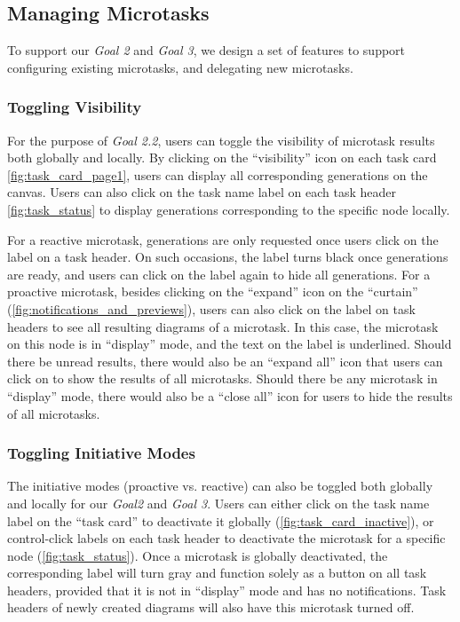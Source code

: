 % 

\subsection{Managing Microtasks}
To support our \textit{Goal 2} and \textit{Goal 3}, we design a set of features to support configuring existing microtasks, and delegating new microtasks.


\subsubsection{Toggling Visibility}
For the purpose of \textit{Goal 2.2}, users can toggle the visibility of microtask results both globally and locally. By clicking on the ``visibility'' icon on each task card \autoref{fig:task_card_page1}, users can display all corresponding generations on the canvas. Users can also click on the task name label on each task header \autoref{fig:task_status} to display generations corresponding to the specific node locally.

For a reactive microtask, generations are only requested once users click on the label on a task header. On such occasions, the label turns black once generations are ready, and users can click on the label again to hide all generations. For a proactive microtask, besides clicking on the ``expand'' icon on the ``curtain'' (\autoref{fig:notifications_and_previews}), users can also click on the label on task headers to see all resulting diagrams of a microtask. In this case, the microtask on this node is in ``display'' mode, and the text on the label is underlined. Should there be unread results, there would also be an ``expand all'' icon that users can click on to show the results of all microtasks. Should there be any microtask in ``display'' mode, there would also be a ``close all'' icon for users to hide the results of all microtasks.

\subsubsection{Toggling Initiative Modes} \label{task_initiative}
The initiative modes (proactive vs. reactive) can also be toggled both globally and locally for our \textit{Goal2} and \textit{Goal 3}. Users can either click on the task name label on the ``task card'' to deactivate it globally (\autoref{fig:task_card_inactive}), or control-click labels on each task header to deactivate the microtask for a specific node (\autoref{fig:task_status}). Once a microtask is globally deactivated, the corresponding label will turn gray and function solely as a button on all task headers, provided that it is not in ``display'' mode and has no notifications. Task headers of newly created diagrams will also have this microtask turned off.

